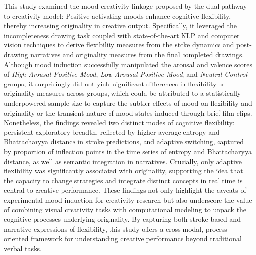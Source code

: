 \documentclass[../MA_Thesis.tex]{subfiles}
\begin{document}
This study examined the mood-creativity linkage proposed by the dual pathway to creativity model: Positive activating moods enhance cognitive flexibility, thereby increasing originality in creative output. Specifically, it leveraged the incompleteness drawing task coupled with state-of-the-art NLP and computer vision techniques to derive flexibility measures from the stoke dynamics and post-drawing narratives and originality measures from the final completed drawings. Although mood induction successfully manipulated the arousal and valence scores of \textit{High-Arousal Positive Mood}, \textit{Low-Arousal Positive Mood}, and \textit{Neutral Control} groups, it surprisingly did not yield significant differences in flexibility or originality measures across groups, which could be attributed to a statistically underpowered sample size to capture the subtler effects of mood on flexibility and originality or the transient nature of mood states induced through brief film clips. Nonetheless, the findings revealed two distinct modes of cognitive flexibility: persistent exploratory breadth, reflected by higher average entropy and Bhattacharyya distance in stroke predictions, and adaptive switching, captured by proportion of inflection points in the time series of entropy and Bhattacharyya distance, as well as semantic integration in narratives. Crucially, only adaptive flexibility was significantly associated with originality, supporting the idea that the capacity to change strategies and integrate distinct concepts in real time is central to creative performance. These findings not only highlight the caveats of experimental mood induction for creativity research but also underscore the value of combining visual creativity tasks with computational modeling to unpack the cognitive processes underlying originality. By capturing both stroke-based and narrative expressions of flexibility, this study offers a cross-modal, process-oriented framework for understanding creative performance beyond traditional verbal tasks. 
\end{document}

